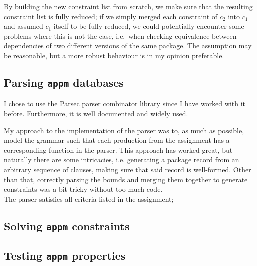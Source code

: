  By building the new constraint list from scratch, we make sure that the resulting constraint list is fully reduced; if we simply merged each constraint of $c_2$ into $c_1$ and assumed $c_1$ itself to be fully reduced, we could potentially encounter some problems where this is not the case, i.e.\ when checking equivalence between dependencies of two different versions of the same package. The assumption may be reasonable, but a more robust behaviour is in my opinion preferable.


\subsection*{Parsing \texttt{appm} databases}
I chose to use the Parsec parser combinator library since I have worked with it before. Furthermore, it is well documented and widely used.

My approach to the implementation of the parser was to, as much as possible, model the grammar such that each production from the assignment has a corresponding function in the parser. This approach has worked great, but naturally there are some intricacies, i.e. generating a package record from an arbitrary sequence of clauses, making sure that said record is well-formed. Other than that, correctly parsing the bounds and merging them together to generate constraints was a bit tricky without too much code. \\

\noindent The parser satisfies all criteria listed in the assignment;




\subsection*{Solving \texttt{appm} constraints}


\subsection*{Testing \texttt{appm} properties}
